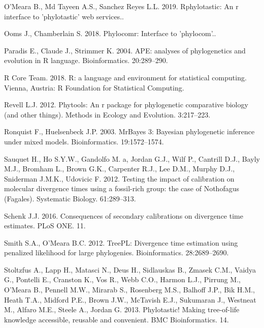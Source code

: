 \documentclass[]{article}
\begin{document}
\leavevmode\hypertarget{ref-Omeara2019}{}%
O'Meara B., Md Tayeen A.S., Sanchez Reyes L.L. 2019. Rphylotastic: An r interface to 'phylotastic' web services..

\leavevmode\hypertarget{ref-Ooms2018}{}%
Ooms J., Chamberlain S. 2018. Phylocomr: Interface to 'phylocom'..

\leavevmode\hypertarget{ref-Paradis2004}{}%
Paradis E., Claude J., Strimmer K. 2004. APE: analyses of phylogenetics and evolution in R language. Bioinformatics. 20:289--290.

\leavevmode\hypertarget{ref-RCoreTeam2018}{}%
R Core Team. 2018. R: a language and environment for statistical computing. Vienna, Austria: R Foundation for Statistical Computing.

\leavevmode\hypertarget{ref-Revell2012}{}%
Revell L.J. 2012. Phytools: An r package for phylogenetic comparative biology (and other things). Methods in Ecology and Evolution. 3:217--223.

\leavevmode\hypertarget{ref-Ronquist2003}{}%
Ronquist F., Huelsenbeck J.P. 2003. MrBayes 3: Bayesian phylogenetic inference under mixed models. Bioinformatics. 19:1572--1574.

\leavevmode\hypertarget{ref-Sauquet2012c}{}%
Sauquet H., Ho S.Y.W., Gandolfo M. a, Jordan G.J., Wilf P., Cantrill D.J., Bayly M.J., Bromham L., Brown G.K., Carpenter R.J., Lee D.M., Murphy D.J., Sniderman J.M.K., Udovicic F. 2012. Testing the impact of calibration on molecular divergence times using a fossil-rich group: the case of Nothofagus (Fagales). Systematic Biology. 61:289--313.

\leavevmode\hypertarget{ref-Schenk2016}{}%
Schenk J.J. 2016. Consequences of secondary calibrations on divergence time estimates. PLoS ONE. 11.

\leavevmode\hypertarget{ref-Smith2012}{}%
Smith S.A., O'Meara B.C. 2012. TreePL: Divergence time estimation using penalized likelihood for large phylogenies. Bioinformatics. 28:2689--2690.

\leavevmode\hypertarget{ref-Stoltzfus2013}{}%
Stoltzfus A., Lapp H., Matasci N., Deus H., Sidlauskas B., Zmasek C.M., Vaidya G., Pontelli E., Cranston K., Vos R., Webb C.O., Harmon L.J., Pirrung M., O'Meara B., Pennell M.W., Mirarab S., Rosenberg M.S., Balhoff J.P., Bik H.M., Heath T.A., Midford P.E., Brown J.W., McTavish E.J., Sukumaran J., Westneat M., Alfaro M.E., Steele A., Jordan G. 2013. Phylotastic! Making tree-of-life knowledge accessible, reusable and convenient. BMC Bioinformatics. 14.
\end{document}
